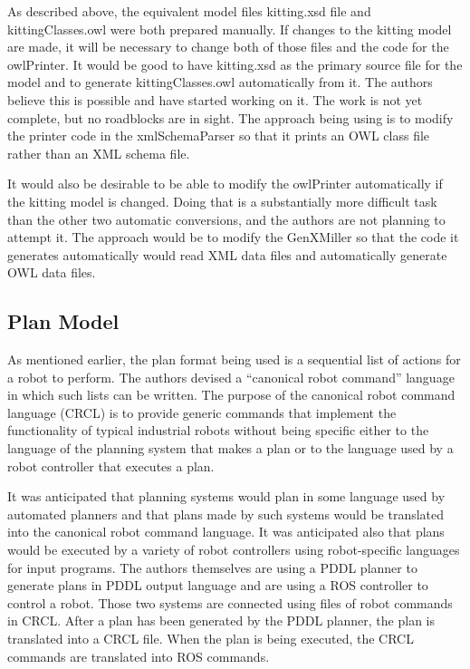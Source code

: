 As described above, the equivalent model files kitting.xsd file and
kittingClasses.owl were both prepared manually. If changes to the kitting
model are made, it will be necessary to change both of those files and the
code for the owlPrinter. It would be good to have kitting.xsd as the
primary source file for the model and to generate kittingClasses.owl
automatically from it. The authors believe this is possible and have
started working on it. The work is not yet complete, but no roadblocks are
in sight. The approach being using is to modify the printer code in the
xmlSchemaParser so that it prints an OWL class file rather than an XML
schema file.

It would also be desirable to be able to modify the owlPrinter
automatically if the kitting model is changed. Doing that is a
substantially more difficult task than the other two automatic conversions,
and the authors are not planning to attempt it. The approach would be to
modify the GenXMiller so that the code it generates automatically would
read XML data files and automatically generate OWL data files.


\subsection{Plan Model}

As mentioned earlier, the plan format being used is a sequential list of
actions for a robot to perform. The authors devised a ``canonical robot
command'' language in which such lists can be written. The purpose of the
canonical robot command language (CRCL) is to provide generic commands that
implement the functionality of typical industrial robots without being
specific either to the language of the planning system that makes a plan or
to the language used by a robot controller that executes a plan. 

It was anticipated that planning systems would plan in some language used
by automated planners and that plans made by such systems would be
translated into the canonical robot command language. It was anticipated
also that plans would be executed by a variety of robot controllers using
robot-specific languages for input programs. The authors themselves are
using a PDDL planner to generate plans in PDDL output language and are
using a ROS controller to control a robot. Those two systems are connected
using files of robot commands in CRCL. After a plan has been generated by
the PDDL planner, the plan is translated into a CRCL file. When the plan is
being executed, the CRCL commands are translated into ROS commands.\\

